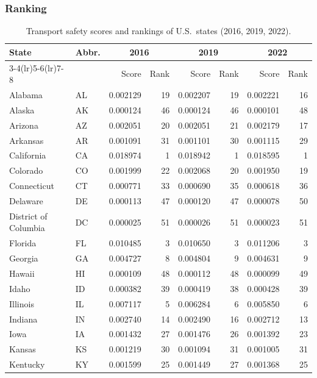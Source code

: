 \documentclass{article}
\begin{document}
\subsubsection{Ranking}
\begin{table}[H]
\centering
\caption{Transport safety scores and rankings of U.S.\ states (2016, 2019, 2022).\label{tab:ranking}}
\scriptsize
\setlength{\tabcolsep}{3pt}
\begin{tabular}{llrrrrrr}
\toprule
\multirow{2}{*}{State} & \multirow{2}{*}{Abbr.} & \multicolumn{2}{c}{2016} & \multicolumn{2}{c}{2019} & \multicolumn{2}{c}{2022} \\
\cmidrule(lr){3-4}\cmidrule(lr){5-6}\cmidrule(lr){7-8}
 & & Score & Rank & Score & Rank & Score & Rank \\
\midrule
Alabama & AL & 0.002129 & 19 & 0.002207 & 19 & 0.002221 & 16 \\
Alaska & AK & 0.000124 & 46 & 0.000124 & 46 & 0.000101 & 48 \\
Arizona & AZ & 0.002051 & 20 & 0.002051 & 21 & 0.002179 & 17 \\
Arkansas & AR & 0.001091 & 31 & 0.001101 & 30 & 0.001115 & 29 \\
California & CA & 0.018974 & 1 & 0.018942 & 1 & 0.018595 & 1 \\
Colorado & CO & 0.001999 & 22 & 0.002068 & 20 & 0.001950 & 19 \\
Connecticut & CT & 0.000771 & 33 & 0.000690 & 35 & 0.000618 & 36 \\
Delaware & DE & 0.000113 & 47 & 0.000120 & 47 & 0.000078 & 50 \\
District of Columbia & DC & 0.000025 & 51 & 0.000026 & 51 & 0.000023 & 51 \\
Florida & FL & 0.010485 & 3 & 0.010650 & 3 & 0.011206 & 3 \\
Georgia & GA & 0.004727 & 8 & 0.004804 & 9 & 0.004631 & 9 \\
Hawaii & HI & 0.000109 & 48 & 0.000112 & 48 & 0.000099 & 49 \\
Idaho & ID & 0.000382 & 39 & 0.000419 & 38 & 0.000428 & 39 \\
Illinois & IL & 0.007117 & 5 & 0.006284 & 6 & 0.005850 & 6 \\
Indiana & IN & 0.002740 & 14 & 0.002490 & 16 & 0.002712 & 13 \\
Iowa & IA & 0.001432 & 27 & 0.001476 & 26 & 0.001392 & 23 \\
Kansas & KS & 0.001219 & 30 & 0.001094 & 31 & 0.001005 & 31 \\
Kentucky & KY & 0.001599 & 25 & 0.001449 & 27 & 0.001368 & 25 \\

\end{tabular}
\end{table}
\end{document}
